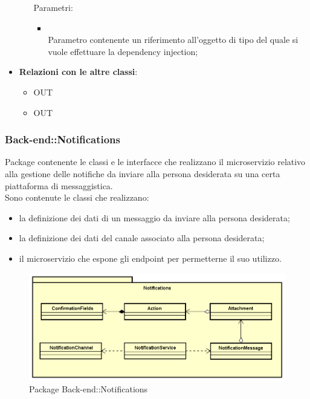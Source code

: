 \begin{itemize}
\begin{itemize}
		Parametri:
		\begin{itemize}
			\item {} \\
			Parametro contenente un riferimento all'oggetto di tipo  del quale si vuole effettuare la dependency injection;
		\end{itemize}
	\end{itemize}
	\item \textbf{Relazioni con le altre classi}:
	\begin{itemize}
		\item OUT \hyperlink{Member_label}{}
		\item OUT \hyperlink{ErrorObservable_label}{}
	\end{itemize}
\end{itemize}
\FloatBarrier

\subsubsection{Back-end::Notifications}
Package contenente le classi e le interfacce che realizzano il microservizio relativo alla gestione delle notifiche da inviare alla persona desiderata su una certa piattaforma di messaggistica.\\
Sono contenute le classi che realizzano:
\begin{itemize}
\item la definizione dei dati di un messaggio da inviare alla persona desiderata;
\item la definizione dei dati del canale associato alla persona desiderata;
\item il microservizio che espone gli endpoint per permetterne il suo utilizzo.
\end{itemize}
\begin{figure}[h] \centering \includegraphics[width=\textwidth,height=\textheight,keepaspectratio]{images/diagrams/back-end/Official_Backend_0304/Notifications.png}
	\caption{Package Back-end::Notifications}
\end{figure}


